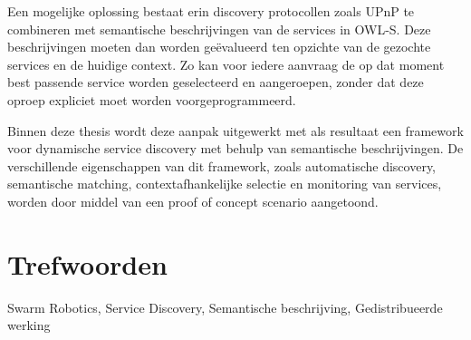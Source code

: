 {Een mogelijke oplossing bestaat erin discovery protocollen zoals UPnP te combineren met semantische beschrijvingen van de services in OWL-S. Deze beschrijvingen moeten dan worden ge\"{e}valueerd ten opzichte van de gezochte services en de huidige context. Zo kan voor iedere aanvraag de op dat moment best passende service worden geselecteerd en aangeroepen, zonder dat deze oproep expliciet moet worden voorgeprogrammeerd.


Binnen deze thesis wordt deze aanpak uitgewerkt met als resultaat een framework voor dynamische service discovery met behulp van semantische beschrijvingen. De verschillende eigenschappen van dit framework, zoals automatische discovery, semantische matching, contextafhankelijke selectie en monitoring van services, worden door middel van een proof of concept scenario aangetoond.

\section*{Trefwoorden}

Swarm Robotics, Service Discovery, Semantische beschrijving, Gedistribueerde werking

}

\newpage %
